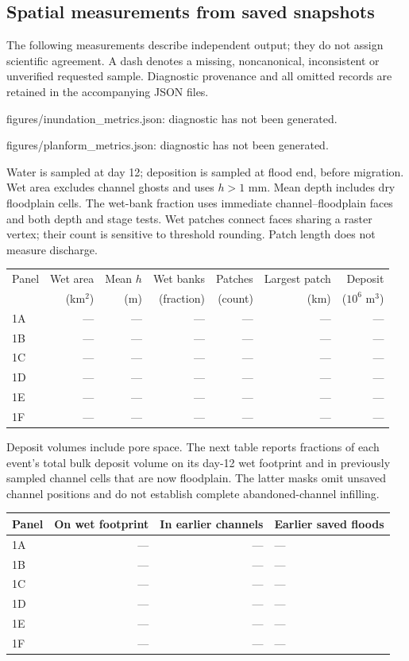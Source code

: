 \subsection{Spatial measurements from saved snapshots}
The following measurements describe independent output; they do not assign scientific agreement. A dash denotes a missing, noncanonical, inconsistent or unverified requested sample. Diagnostic provenance and all omitted records are retained in the accompanying JSON files.\par
figures/inundation\_metrics.json: diagnostic has not been generated.\par
figures/planform\_metrics.json: diagnostic has not been generated.\par
Water is sampled at day 12; deposition is sampled at flood end, before migration. Wet area excludes channel ghosts and uses $h>1$ mm. Mean depth includes dry floodplain cells. The wet-bank fraction uses immediate channel--floodplain faces and both depth and stage tests. Wet patches connect faces sharing a raster vertex; their count is sensitive to threshold rounding. Patch length does not measure discharge.\par
\begin{center}\small\begin{tabular}{lrrrrrr}\toprule
Panel & Wet area & Mean $h$ & Wet banks & Patches & Largest patch & Deposit \\
 & (km$^2$) & (m) & (fraction) & (count) & (km) & ($10^6$ m$^3$) \\ \midrule
1A & --- & --- & --- & --- & --- & --- \\
1B & --- & --- & --- & --- & --- & --- \\
1C & --- & --- & --- & --- & --- & --- \\
1D & --- & --- & --- & --- & --- & --- \\
1E & --- & --- & --- & --- & --- & --- \\
1F & --- & --- & --- & --- & --- & --- \\
\bottomrule\end{tabular}\end{center}
Deposit volumes include pore space. The next table reports fractions of each event's total bulk deposit volume on its day-12 wet footprint and in previously sampled channel cells that are now floodplain. The latter masks omit unsaved channel positions and do not establish complete abandoned-channel infilling.\par
\begin{center}\small\begin{tabular}{lrrl}\toprule
Panel & On wet footprint & In earlier channels & Earlier saved floods \\ \midrule
1A & --- & --- & --- \\
1B & --- & --- & --- \\
1C & --- & --- & --- \\
1D & --- & --- & --- \\
1E & --- & --- & --- \\
1F & --- & --- & --- \\
\bottomrule\end{tabular}\end{center}
